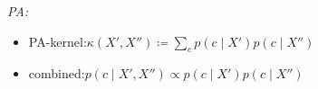 


\emph{PA:}\enspace
{}
\begin{itemize}
    \item PA-kernel:\enskip $\kappa (X', X'') \coloneqq \sum_c p(c\mid X') p(c\mid X'')$
    \item combined:\enskip $p(c\mid X', X'') \propto p(c\mid X') p(c\mid X'')$
\end{itemize}

